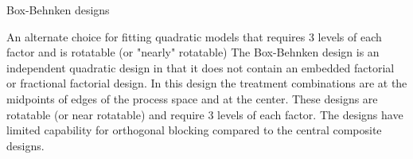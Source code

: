 Box-Behnken designs

An alternate choice for fitting quadratic models that requires 3 levels of each factor and is rotatable (or "nearly" rotatable)	The Box-Behnken design is an independent quadratic design in that it does not contain an embedded factorial or fractional factorial design. In this design the treatment combinations are at the midpoints of edges of the process space and at the center. These designs are rotatable (or near rotatable) and require 3 levels of each factor. 
The designs have limited capability for orthogonal blocking compared to the central composite designs.
